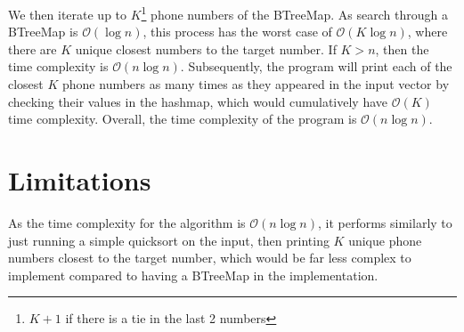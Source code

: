 \documentclass{report}
\begin{document}
We then iterate up to \(K\)\footnote{\(K+1\) if there is a tie in the last 2 numbers} phone numbers of the BTreeMap. As search through a BTreeMap is \(\mathcal{O}(\log{n})\), this process has the worst case of \(\mathcal{O}(K \log n)\), where there are \(K\) unique closest numbers to the target number. If \(K > n\), then the time complexity is \(\mathcal{O}(n \log n)\). Subsequently, the program will print each of the closest \(K\) phone numbers as many times as they appeared in the input vector by checking their values in the hashmap, which would cumulatively have \(\mathcal{O}(K)\) time complexity. Overall, the time complexity of the program is \(\mathcal{O}(n \log n)\).

\section{Limitations}\label{sec:limitations}
As the time complexity for the algorithm is \(\mathcal{O}(n \log n)\), it performs similarly to just running a simple quicksort on the input, then printing \(K\) unique phone numbers closest to the target number, which would be far less complex to implement compared to having a BTreeMap in the implementation.
\end{document}
